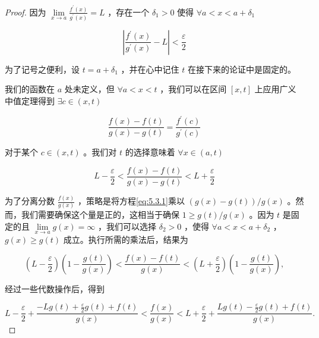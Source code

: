 \begin{proof}
因为 \(\mathop{\lim }\limits_{{x \rightarrow  a}}\frac{{f}^{\prime }\left( x\right) }{{g}^{\prime }\left( x\right) } = L\) ，存在一个 \({\delta }_{1} > 0\) 使得 $\forall a < x < a + {\delta }_{1}$

\[
\left| {\frac{{f}^{\prime }\left( x\right) }{{g}^{\prime }\left( x\right) } - L}\right|  < \frac{\varepsilon }{2}
\]

为了记号之便利，设 \(t = a + {\delta }_{1}\) ，并在心中记住 \(t\) 在接下来的论证中是固定的。

我们的函数在 \(a\) 处未定义，但 \(\forall a < x < t\) ，我们可以在区间 \(\left\lbrack  {x,t}\right\rbrack\) 上应用广义中值定理得到 $\exists c\in (x,t)$

\[
\frac{f\left( x\right)  - f\left( t\right) }{g\left( x\right)  - g\left( t\right) } = \frac{{f}^{\prime }\left( c\right) }{{g}^{\prime }\left( c\right) }
\]

对于某个 \(c \in  \left( {x,t}\right)\) 。我们对 \(t\) 的选择意味着 $\forall x\in (a,t)$

\begin{equation}
\label{eq:5.3.1}
L - \frac{\varepsilon }{2} < \frac{f\left( x\right)  - f\left( t\right) }{g\left( x\right)  - g\left( t\right) } < L + \frac{\varepsilon }{2}
\end{equation}

为了分离分数 \(\frac{f\left( x\right) }{g\left( x\right) }\) ，策略是将方程\eqref{eq:5.3.1}乘以 \(\left( {g\left( x\right)  - g\left( t\right) }\right) /g\left( x\right)\) 。然而，我们需要确保这个量是正的，这相当于确保 \(1 \geq  g\left( t\right) /g\left( x\right)\) 。因为 \(t\) 是固定的且 \(\mathop{\lim }\limits_{{x \rightarrow  a}}g\left( x\right)  = \infty\) ，我们可以选择 \({\delta }_{2} > 0\) ，使得 \(\forall a < x < a + {\delta }_{2}\) ， \(g\left( x\right)  \geq  g\left( t\right)\) 成立。执行所需的乘法后，结果为

\[
\left( {L - \frac{\varepsilon }{2}}\right) \left( {1 - \frac{g\left( t\right) }{g\left( x\right) }}\right)  < \frac{f\left( x\right)  - f\left( t\right) }{g\left( x\right) } < \left( {L + \frac{\varepsilon }{2}}\right) \left( {1 - \frac{g\left( t\right) }{g\left( x\right) }}\right) ,
\]

经过一些代数操作后，得到

\[
L - \frac{\varepsilon }{2} + \frac{-{Lg}\left( t\right)  + \frac{\varepsilon }{2}g\left( t\right)  + f\left( t\right) }{g\left( x\right) } < \frac{f\left( x\right) }{g\left( x\right) } < L + \frac{\varepsilon }{2} + \frac{{Lg}\left( t\right)  - \frac{\varepsilon }{2}g\left( t\right)  + f\left( t\right) }{g\left( x\right) }.
\]


\end{proof}
